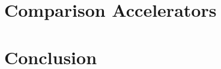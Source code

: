 \documentclass[conference]{IEEEtran}
\begin{document}
\section{Comparison Accelerators}






\section{Conclusion}

\newpage
\quad
\newpage


\end{document}

